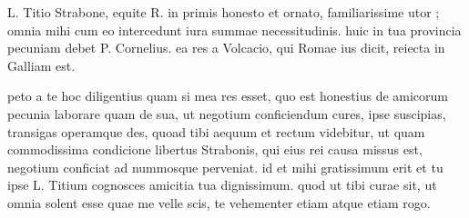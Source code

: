 


 L. Titio Strabone, equite R. in primis honesto et ornato, familiarissime utor ; omnia mihi cum eo intercedunt iura summae necessitudinis. huic in tua provincia pecuniam debet P. Cornelius. ea res a Volcacio, qui Romae ius dicit, reiecta in Galliam est.

 peto a te hoc diligentius quam si mea res esset, quo est honestius de amicorum pecunia laborare quam de sua, ut negotium conficiendum cures, ipse suscipias, transigas operamque des, quoad tibi aequum et rectum videbitur, ut quam commodissima condicione libertus Strabonis, qui eius rei causa missus est, negotium conficiat ad nummosque perveniat. id et mihi gratissimum erit et tu ipse L. Titium cognosces amicitia tua dignissimum. quod ut tibi curae sit, ut omnia solent esse quae me velle scis, te vehementer etiam atque etiam rogo.
